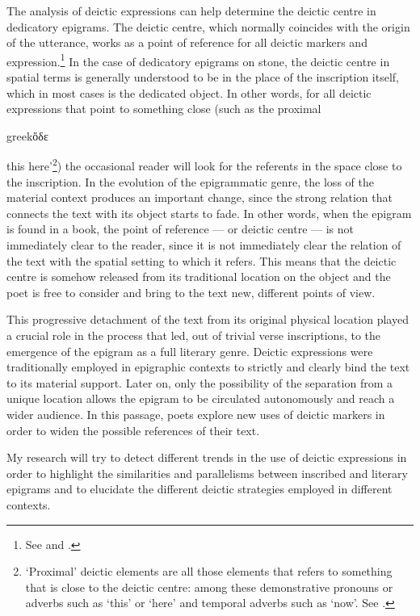 \documentclass[amsthm,ebook]{saparticle}
\begin{document}
The analysis of deictic expressions can help determine the deictic centre in dedicatory epigrams. The deictic
centre, which normally coincides with the origin of the utterance, works as a point of reference for all deictic
markers and expression.\footnote{See \citet[102f.]{buhler_sprachtheorie:_1982} and \citet[63f.]{levinson_pragmatics_1983}.} In the case of dedicatory
epigrams on stone, the deictic centre in spatial terms is generally understood to be in the place of the inscription
itself, which in most cases is the dedicated object. In other words, for all deictic expressions that point to
something close (such as the proximal \begin{otherlanguage*}{greek}ὅδε\end{otherlanguage*} this here'\footnote{ `Proximal' deictic elements are all those
elements that refers to something that is close to the deictic centre: among these demonstrative pronouns or adverbs such as `this' or `here' and
temporal adverbs such as `now'. See \citet[2408f.]{diessel_deixis_2012}.}) the occasional reader will look for the referents in the
space close to the inscription. In the evolution of the epigrammatic genre, the loss of the material context produces
an important change, since the strong relation that connects the text with its object starts to fade. In other words, when the epigram is found in a book, the point of reference --- or deictic centre --- is not immediately clear to the reader, since it is not immediately clear the relation of the text with the spatial setting to which it refers.  This means that
the deictic centre is somehow released from its traditional location on the object and the poet is free to consider and
bring to the text new, different points of view. 

This progressive detachment of the text from its original physical location played a crucial role in the process
that led, out of trivial verse inscriptions, to the emergence of the epigram as a full literary genre. Deictic
expressions were traditionally employed in epigraphic contexts to strictly and clearly bind the text to its material
support. Later on, only the possibility of the separation from a unique location allows the epigram to be circulated
autonomously and reach a wider audience. In this passage, poets explore new uses of deictic markers in order to
widen the possible references of their text. 

My research will try to detect different trends in the use of deictic expressions in order to highlight the similarities
and parallelisms between inscribed and literary epigrams and to elucidate the different deictic strategies employed in
different contexts.
\end{document}
